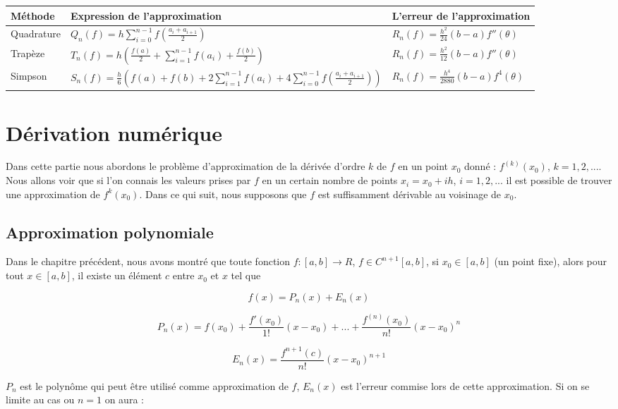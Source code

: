 \begin{table}[H]
	\centering
	{\small
	\begin{tabular}{lll}
		Méthode & Expression de l'approximation & L'erreur de l'approximation \\
		\hline
		Quadrature & \( Q_n(f) = h \displaystyle\sum_{i=0}^{n-1} f\left(\frac{a_i + a_{i+1}}{2}\right) \) & \( R_n(f) = \frac{h^2}{24}(b - a)f''(\theta) \) \\
		Trapèze & \( T_n(f) = h \left( \frac{f(a)}{2} + \displaystyle\sum_{i=1}^{n-1} f(a_i) + \frac{f(b)}{2} \right) \) & \( R_n(f) = \frac{h^2}{12}(b - a)f''(\theta) \) \\
		Simpson & \( S_n(f) = \frac{h}{6} \left( f(a) + f(b) + 2 \displaystyle\sum_{i=1}^{n-1} f(a_i) + 4 \displaystyle\sum_{i=0}^{n-1} f\left(\frac{a_i + a_{i+1}}{2}\right) \right) \) & \( R_n(f) = \frac{h^4}{2880}(b - a)f^4(\theta) \) \\
	\end{tabular}
}
\end{table}

\section{Dérivation numérique}
Dans cette partie nous abordons le problème d'approximation de la dérivée d'ordre \( k \) de \( f \) en un point \( x_0 \) donné : \( f^{(k)}(x_0) \), \( k = 1,2,... \). Nous allons voir que si l'on connais les valeurs prises par \( f \) en un certain nombre de points \( x_i = x_0 + ih \), \( i = 1,2,... \) il est possible de trouver une approximation de \( f^k(x_0) \). Dans ce qui suit, nous supposons que \( f \) est suffisamment dérivable au voisinage de \( x_0 \).

\subsection{Approximation polynomiale}
Dans le chapitre précédent, nous avons montré que toute fonction \( f : [a,b] \rightarrow R \), \( f \in C^{n+1}[a,b] \), si \( x_0 \in [a,b] \) (un point fixe), alors pour tout \( x \in [a,b] \), il existe un élément \( c \) entre \( x_0 \) et \( x \) tel que

\[
f(x) = P_n(x) + E_n(x)
\]

\[
P_n(x) = f(x_0) + \frac{f'(x_0)}{1!}(x - x_0) + ... + \frac{f^{(n)}(x_0)}{n!}(x - x_0)^n
\]

\[
E_n(x) = \frac{f^{n+1}(c)}{n!}(x - x_0)^{n+1}
\]

\( P_n \) est le polynôme qui peut être utilisé comme approximation de \( f \), \( E_n(x) \) est l'erreur commise lors de cette approximation. Si on se limite au cas ou \( n = 1 \) on aura :

